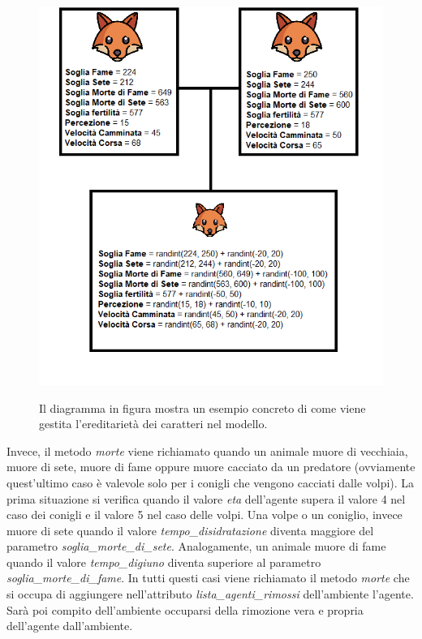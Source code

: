 \documentclass[11pt]{article}
\begin{document}
\begin{figure}[h!]
     \centering
     \includegraphics[scale = 0.8]{Accoppiamento_evoluzione.png}
     \label{fig:EsempioEvoluzione}
     \caption{Il diagramma in figura mostra un esempio concreto di come viene gestita l'ereditarietà dei caratteri nel modello.}
\end{figure}

Invece, il metodo \emph{morte} viene richiamato quando un animale muore di vecchiaia, muore di sete, muore di fame oppure muore cacciato da un predatore (ovviamente quest'ultimo caso è valevole solo per i conigli che vengono cacciati dalle volpi). La prima situazione si verifica quando il valore \emph{eta} dell'agente supera il valore 4 nel caso dei conigli e il valore 5 nel caso delle volpi. Una volpe o un coniglio, invece muore di sete quando il valore \emph{tempo\_disidratazione} diventa maggiore del parametro \emph{soglia\_morte\_di\_sete}. Analogamente, un animale muore di fame quando il valore \emph{tempo\_digiuno} diventa superiore al parametro \emph{soglia\_morte\_di\_fame}. In tutti questi casi viene richiamato il metodo \emph{morte} che si occupa di aggiungere nell'attributo \emph{lista\_agenti\_rimossi} dell'ambiente l'agente. Sarà poi compito dell'ambiente occuparsi della rimozione vera e propria dell'agente dall'ambiente. 
\end{document}
